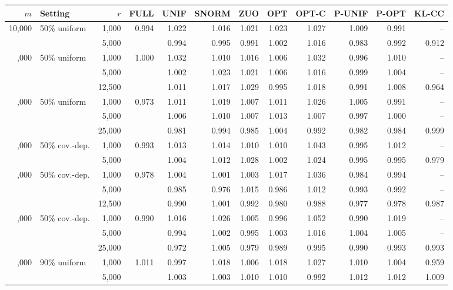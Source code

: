 \begin{tabular}{rlrrrrrrrrrr}
\toprule
\(m\) & Setting & \(r\) & FULL & UNIF & SNORM & ZUO & OPT & OPT-C & P-UNIF & P-OPT & KL-CC\\
\midrule
10,000 & 50\% uniform & 1,000 & 0.994 & 1.022 & 1.016 & 1.021 & 1.023 & 1.027 & 1.009 & 0.991 & --\\
 &  & 5,000 &  & 0.994 & 0.995 & 0.991 & 1.002 & 1.016 & 0.983 & 0.992 & 0.912\\
\addlinespace
25,000 & 50\% uniform & 1,000 & 1.000 & 1.032 & 1.010 & 1.016 & 1.006 & 1.032 & 0.996 & 1.010 & --\\
 &  & 5,000 &  & 1.002 & 1.023 & 1.021 & 1.006 & 1.016 & 0.999 & 1.004 & --\\
 &  & 12,500 &  & 1.011 & 1.017 & 1.029 & 0.995 & 1.018 & 0.991 & 1.008 & 0.964\\
\addlinespace
50,000 & 50\% uniform & 1,000 & 0.973 & 1.011 & 1.019 & 1.007 & 1.011 & 1.026 & 1.005 & 0.991 & --\\
 &  & 5,000 &  & 1.006 & 1.010 & 1.007 & 1.013 & 1.007 & 0.997 & 1.000 & --\\
 &  & 25,000 &  & 0.981 & 0.994 & 0.985 & 1.004 & 0.992 & 0.982 & 0.984 & 0.999\\
\addlinespace
10,000 & 50\% cov.-dep. & 1,000 & 0.993 & 1.013 & 1.014 & 1.010 & 1.010 & 1.043 & 0.995 & 1.012 & --\\
 &  & 5,000 &  & 1.004 & 1.012 & 1.028 & 1.002 & 1.024 & 0.995 & 0.995 & 0.979\\
\addlinespace
25,000 & 50\% cov.-dep. & 1,000 & 0.978 & 1.004 & 1.001 & 1.003 & 1.017 & 1.036 & 0.984 & 0.994 & --\\
 &  & 5,000 &  & 0.985 & 0.976 & 1.015 & 0.986 & 1.012 & 0.993 & 0.992 & --\\
 &  & 12,500 &  & 0.990 & 1.001 & 0.992 & 0.980 & 0.988 & 0.977 & 0.978 & 0.987\\
\addlinespace
50,000 & 50\% cov.-dep. & 1,000 & 0.990 & 1.016 & 1.026 & 1.005 & 0.996 & 1.052 & 0.990 & 1.019 & --\\
 &  & 5,000 &  & 0.994 & 1.002 & 0.995 & 1.003 & 1.016 & 1.004 & 1.005 & --\\
 &  & 25,000 &  & 0.972 & 1.005 & 0.979 & 0.989 & 0.995 & 0.990 & 0.993 & 0.993\\
\addlinespace
10,000 & 90\% uniform & 1,000 & 1.011 & 0.997 & 1.018 & 1.006 & 1.018 & 1.027 & 1.010 & 1.004 & 0.959\\
 &  & 5,000 &  & 1.003 & 1.003 & 1.010 & 1.010 & 0.992 & 1.012 & 1.012 & 1.009\\

\end{tabular}
